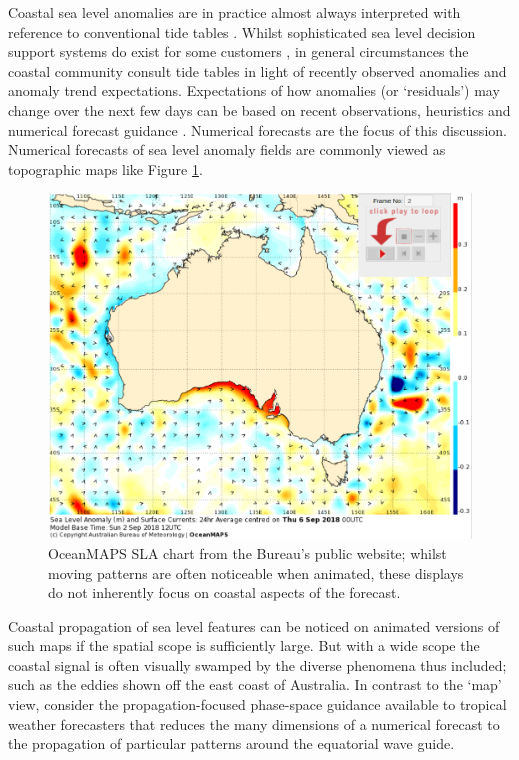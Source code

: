Coastal sea level anomalies are in practice almost always interpreted with reference to conventional tide tables \citep{PCTMSL-sp9}.
Whilst sophisticated sea level decision support systems do exist for some customers \citep{James:2017gj}, in general circumstances the coastal community consult tide tables in light of recently observed anomalies and anomaly trend expectations.
Expectations of how anomalies (or `residuals') may change over the next few days can be based on recent observations, heuristics and numerical forecast guidance \citep{Taylor:2017coa, Horsburgh:2011th}.   Numerical forecasts are the focus of this discussion.
Numerical forecasts of sea level anomaly fields are commonly viewed as topographic maps like Figure \ref{fig:oldcharts}.
\begin{figure}[H]\centering
    \includegraphics[width=\figwidthBig]{figures/maps/omaps_chart_anim_eg.png}
    \caption[OceanMAPS SLA chart from the Bureau's public website]{ OceanMAPS SLA chart from the Bureau's public website;
              whilst moving patterns are often noticeable when animated, these displays do not inherently focus on coastal aspects of the forecast.  \protect\citep{urlBOM_SLA:2018} }
    \label{fig:oldcharts}
\end{figure}  
Coastal propagation of sea level features can be noticed on animated versions of such maps if the spatial scope is sufficiently large.
But with a wide scope the coastal signal is often visually swamped by the diverse phenomena thus included; such as the eddies shown off the east coast of Australia.
In contrast to the `map' view, consider the propagation-focused phase-space guidance available to tropical weather forecasters \citep{Wheeler:2001} that reduces the many dimensions of a numerical forecast to the propagation of particular patterns around the equatorial wave guide.

